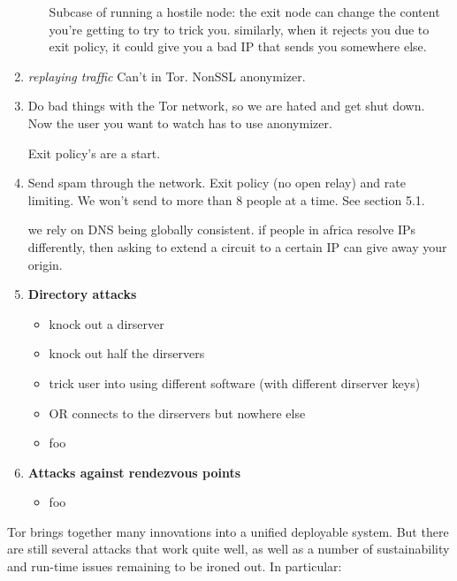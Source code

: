 \documentclass[times,10pt,twocolumn]{article}
\begin{document}
\begin{enumerate}
\begin{itemize}
Subcase of running a hostile node: 
the exit node can change the content you're getting to try to
trick you. similarly, when it rejects you due to exit policy,
it could give you a bad IP that sends you somewhere else.
\end{itemize}
\item \emph{replaying traffic} Can't in Tor. NonSSL anonymizer.

\item Do bad things with the Tor network, so we are hated and
get shut down. Now the user you want to watch has to use anonymizer.

Exit policy's are a start.

\item Send spam through the network. Exit policy (no open relay) and
  rate limiting. We won't send to more than 8 people at a time.  See
  section 5.1.

we rely on DNS being globally consistent. if people in africa resolve
IPs differently, then asking to extend a circuit to a certain IP can
give away your origin.

\item \textbf{Directory attacks}
\begin{itemize}
\item knock out a dirserver
\item knock out half the dirservers
\item trick user into using different software (with different dirserver
keys)
\item OR connects to the dirservers but nowhere else
\item foo
\end{itemize}

\item \textbf{Attacks against rendezvous points}
\begin{itemize}
\item foo
\end{itemize}

\end{enumerate}


\label{sec:conclusion}


Tor brings together many innovations into
a unified deployable system. But there are still several attacks that
work quite well, as well as a number of sustainability and run-time
issues remaining to be ironed out. In particular:
\end{document}
